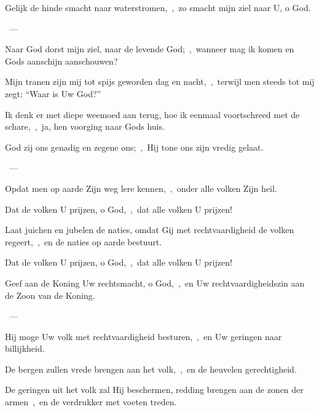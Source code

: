 \documentclass[12pt,twoside,a5paper]{article}
\begin{document}

\begin{halfparskip}
  Gelijk de hinde smacht naar waterstromen,~\sep\ zo smacht mijn ziel naar U, o God.

  ~--- 

  Naar God dorst mijn ziel, naar de levende God;~\sep\ wanneer mag ik komen en Gods aanschijn aanschouwen?

  Mijn tranen zijn mij tot spijs geworden dag en nacht,~\sep\ terwijl men steeds tot mij zegt: ``Waar is Uw God?''

  Ik denk er met diepe weemoed aan terug, hoe ik eenmaal voortschreed met de schare,~\sep\ ja, hen voorging naar Gods huis.
\end{halfparskip}


\begin{halfparskip}
  God zij ons genadig en zegene ons;~\sep\ Hij tone ons zijn vredig gelaat.

  ~--- 

  Opdat men op aarde Zijn weg lere kennen,~\sep\ onder alle volken Zijn heil.

  Dat de volken U prijzen, o God,~\sep\ dat alle volken U prijzen!

  Laat juichen en jubelen de naties, omdat Gij met rechtvaardigheid de volken regeert,~\sep\ en de naties op aarde bestuurt.

  Dat de volken U prijzen, o God,~\sep\ dat alle volken U prijzen!
\end{halfparskip}


\begin{halfparskip}
  Geef aan de Koning Uw rechtsmacht, o God,~\sep\ en Uw rechtvaardigheidszin aan de Zoon van de Koning.

  ~--- 

  Hij moge Uw volk met rechtvaardigheid besturen,~\sep\ en Uw geringen naar billijkheid.

  De bergen zullen vrede brengen aan het volk,~\sep\ en de heuvelen gerechtigheid.

  De geringen uit het volk zal Hij beschermen, redding brengen aan de zonen der armen~\sep\ en de verdrukker met voeten treden.
\end{halfparskip}
\end{document}

